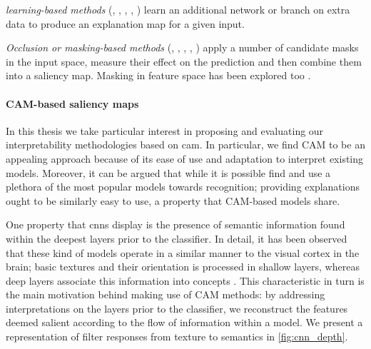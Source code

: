 \noindent \emph{learning-based methods} (\cite{chang2018explaining}, \cite{dabkowski2017real}, 
\cite{phang2020investigating}, \cite{zolna2020classifier}, \cite{schulz2020restricting}) learn an 
additional network or branch on extra data to produce an explanation map for a given input. 

\noindent \emph{Occlusion or masking-based methods} (\cite{petsiuk2018rise}, 
\cite{fong2017interpretable}, \cite{fong2019understanding}, \cite{schulz2020restricting}, 
\cite{ribeiro2016should}) apply a 	number of candidate masks in the input space, measure their 
effect on the prediction and then combine them into a saliency map. Masking in feature space 
has been explored too \autocite{schulz2020restricting}. 


\paragraph{CAM-based saliency maps}
In this thesis we take particular interest in proposing and evaluating our interpretability 
methodologies based on \gls{cam}. In particular, we find CAM to be an appealing approach because of 
its ease of use and adaptation to interpret existing models. Moreover, it can be argued that while 
it is possible find and use a plethora of the most popular models towards recognition; providing 
explanations ought to be similarly easy to use, a property that CAM-based models share.

One property that \glspl{cnn} display is the presence of semantic information found within the 
deepest layers prior to the classifier. In detail, it has been observed that these kind of models 
operate in a similar manner to the visual cortex in the brain; basic textures and their orientation 
is processed in shallow layers, whereas deep layers associate this information into concepts 
\autocite{hubel1959receptive}. This characteristic in turn is the main motivation behind making 
use of CAM methods: by addressing interpretations on the layers prior to the classifier, we 
reconstruct the features deemed salient according to the flow of information within a model. We 
present a representation of filter responses from texture to semantics in \autoref{fig:cnn_depth}.



